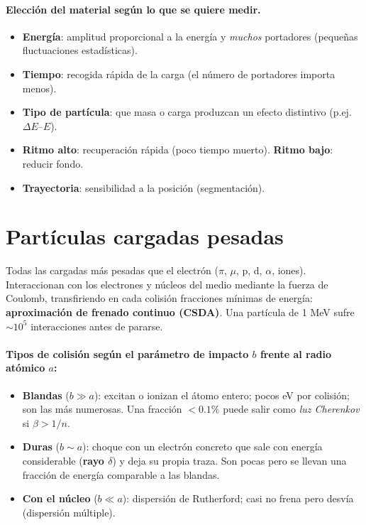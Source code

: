 \paragraph{Elección del material según lo que se quiere medir.}
\begin{itemize}
\item \textbf{Energía}: amplitud proporcional a la energía y \emph{muchos} portadores (pequeñas fluctuaciones estadísticas).
\item \textbf{Tiempo}: recogida rápida de la carga (el número de portadores importa menos).
\item \textbf{Tipo de partícula}: que masa o carga produzcan un efecto distintivo (p.ej.\ $\Delta E$--$E$).
\item \textbf{Ritmo alto}: recuperación rápida (poco tiempo muerto). \textbf{Ritmo bajo}: reducir fondo.
\item \textbf{Trayectoria}: sensibilidad a la posición (segmentación).
\end{itemize}

\section{Partículas cargadas pesadas}
Todas las cargadas más pesadas que el electrón ($\pi$, $\mu$, p, d, $\alpha$, iones). Interaccionan
con los electrones y núcleos del medio mediante la fuerza de Coulomb, transfiriendo en cada
colisión fracciones mínimas de energía: \textbf{aproximación de frenado continuo (CSDA)}.
Una partícula de 1 MeV sufre $\sim10^5$ interacciones antes de pararse.

\paragraph{Tipos de colisión según el parámetro de impacto $b$ frente al radio atómico $a$:}
\begin{itemize}
\item \textbf{Blandas} ($b\gg a$): excitan o ionizan el átomo entero; pocos eV por colisión; son las más numerosas.
Una fracción $<0.1\%$ puede salir como \emph{luz Cherenkov} si $\beta>1/n$.
\item \textbf{Duras} ($b\sim a$): choque con un electrón concreto que sale con energía considerable
(\textbf{rayo $\delta$}) y deja su propia traza. Son pocas pero se llevan una fracción de energía comparable a las blandas.
\item \textbf{Con el núcleo} ($b\ll a$): dispersión de Rutherford; casi no frena pero desvía (dispersión múltiple).
\end{itemize}

